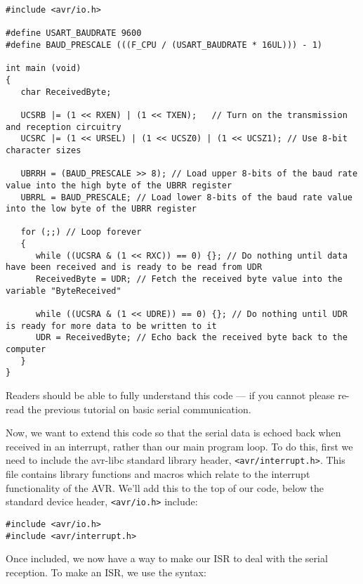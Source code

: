 \documentclass[a4paper,oneside]{book}
\begin{document}
\begin{center}
\begin{lstlisting}
#include <avr/io.h>

#define USART_BAUDRATE 9600
#define BAUD_PRESCALE (((F_CPU / (USART_BAUDRATE * 16UL))) - 1)

int main (void)
{
   char ReceivedByte;

   UCSRB |= (1 << RXEN) | (1 << TXEN);   // Turn on the transmission and reception circuitry
   UCSRC |= (1 << URSEL) | (1 << UCSZ0) | (1 << UCSZ1); // Use 8-bit character sizes

   UBRRH = (BAUD_PRESCALE >> 8); // Load upper 8-bits of the baud rate value into the high byte of the UBRR register
   UBRRL = BAUD_PRESCALE; // Load lower 8-bits of the baud rate value into the low byte of the UBRR register

   for (;;) // Loop forever
   {
      while ((UCSRA & (1 << RXC)) == 0) {}; // Do nothing until data have been received and is ready to be read from UDR
      ReceivedByte = UDR; // Fetch the received byte value into the variable "ByteReceived"

      while ((UCSRA & (1 << UDRE)) == 0) {}; // Do nothing until UDR is ready for more data to be written to it
      UDR = ReceivedByte; // Echo back the received byte back to the computer
   }   
}
\end{lstlisting}
\end{center}

Readers should be able to fully understand this code --- if you cannot please re-read the previous tutorial on basic serial communication.

Now, we want to extend this code so that the serial data is echoed back when received in an interrupt, rather than our main program loop. To do this, first we need to include the avr-libc standard library header, \texttt{<avr/interrupt.h>}. This file contains library functions and macros which relate to the interrupt functionality of the AVR. We'll add this to the top of our code, below the standard device header, \texttt{<avr/io.h>}  include:

\begin{center}
\begin{lstlisting}
#include <avr/io.h>
#include <avr/interrupt.h>
\end{lstlisting}
\end{center}

Once included, we now have a way to make our ISR to deal with the serial reception. To make an ISR, we use the syntax:
\end{document}
